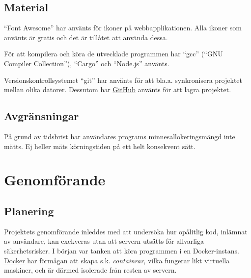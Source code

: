 \documentclass{article}
\begin{document}
\subsection{Material}

``Font Awesome'' har använts för ikoner på webbapplikationen. Alla ikoner som
använts är gratis och det är tillåtet att använda dessa.

För att kompilera och köra de utvecklade programmen har ``gcc'' (``GNU Compiler
Collection''), ``Cargo'' och ``Node.js'' använts.

Versionskontrollsystemet ``git'' har använts för att bla.a. synkronisera
projektet mellan olika datorer. Dessutom har \href{https://github.com/}{GitHub}
använts för att lagra projektet.


\subsection{Avgränsningar}

På grund av tidsbrist har användares programs minnesallokeringsmängd inte mätts.
Ej heller mäts körningstiden på ett helt konsekvent sätt.

\section{Genomförande}

\subsection{Planering}

Projektets genomförande inleddes med att undersöka hur opålitlig kod, inlämnat
av användare, kan exekveras utan att servern utsätts för allvarliga
säkerhetsrisker. I början var tanken att köra programmen i en Docker-instans.
\href{https://www.docker.com}{Docker} har förmågan att skapa s.k.
\textit{containrar}, vilka fungerar likt virtuella maskiner, och är därmed
isolerade från resten av servern.
\end{document}
